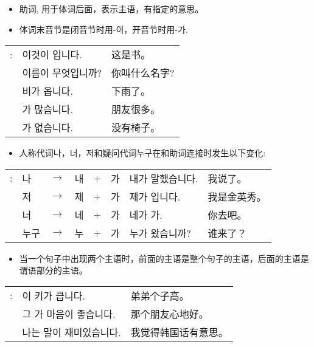 \begin{grammar}
    \begin{grammarsect}[\kr -이/-가]
        \begin{itemize}
            \item 助词, 用于体词后面，表示主语，有指定的意思。
            \item 体词末音节是闭音节时用{\kr -이}，开音节时用{\kr -가}.
        \end{itemize}
        \begin{tabular}{lll}
            \kr \ruby{例}{예}:& \kr 이것이 \ruby{冊}{책}입니다.&这是书。\\
            &\kr 이름이 무엇입니까?&你叫什么名字?\\
            &\kr 비가 옵니다.&下雨了。\\
            &\kr \ruby{親舊}{친구}가 많습니다.&朋友很多。\\
            &\kr \ruby{椅子}{의자}가 없습니다.&没有椅子。
        \end{tabular}
        \begin{itemize}
            \item 人称代词{\kr 나，너，저}和疑问代词{\kr 누구}在和助词连接时发生以下变化:
        \end{itemize}
        \begin{tabular}{llllllll}
            \kr \ruby{例}{예}:&\kr 나 &$\to$&\kr 내&+&\kr 가&\kr 내가 말했습니다.&我说了。\\
            &\kr 저&$\to$&\kr 제&+ &\kr 가 &\kr 제가 \ruby{金英秀}{김영수}입니다. &我是金英秀。\\
            &\kr 너& $\to$ &\kr 네 &+ &\kr 가 &\kr 네가 가. &你去吧。\\
            &\kr 누구 &$\to$&\kr 누& + &\kr 가 &\kr 누가 왔습니까? &谁来了？\\
        \end{tabular}
        \begin{itemize}
            \item 当一个句子中出现两个主语时，前面的主语是整个句子的主语，后面的主语是谓语部分的主语。
        \end{itemize}
        \begin{tabular}{lll}
            \kr \ruby{例}{예}: &\kr \ruby{同生}{동생}이 키가 큽니다.&弟弟个子高。\\
            &\kr 그 \ruby{親舊}{친구}가 마음이 좋습니다.&那个朋友心地好。\\
            &\kr 나는 \ruby{韓國}{한국}말이 재미있습니다.&我觉得韩国话有意思。\\

\end{tabular}
\end{grammarsect}
\end{grammar}

